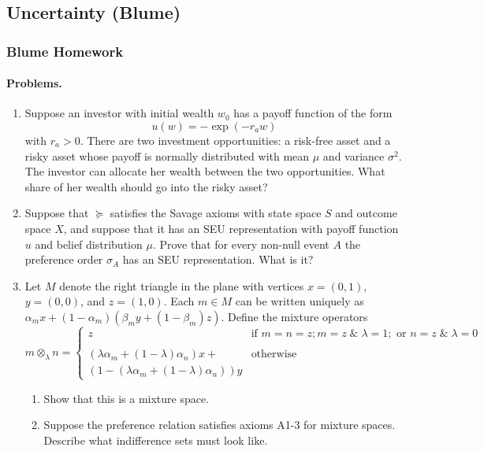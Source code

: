 \documentclass[12pt]{article}
\begin{document}
\newpage
\subsection{Uncertainty (Blume)}

\subsubsection{Blume Homework}

\paragraph{Problems.}

\begin{enumerate}
	\item Suppose an investor with initial wealth $w_0$ has a payoff function of the form
	\[
	u(w) = -\exp (-r_a w)
	\]
	with $r_a > 0$. There are two investment opportunities: a risk-free asset and a risky asset whose payoff is normally distributed with mean $\mu$ and variance $\sigma^2$. The investor can allocate her wealth between the two opportunities. What share of her wealth should go into the risky asset?
	\item Suppose that $\succeq$ satisfies the Savage axioms with state space $S$ and outcome space $X$, and suppose that it has an SEU representation with payoff function $u$ and belief distribution $\mu$. Prove that for every non-null event $A$ the preference order $\sigma_A$ has an SEU representation. What is it?
	\item Let $M$ denote the right triangle in the plane with vertices $x = (0,1)$, $y = (0,0)$, and $z = (1,0)$. Each $m \in M$ can be written uniquely as $\alpha_mx + (1-\alpha_m)(\beta_m y + (1-\beta_m)z)$. Define the mixture operators
	\[
	m \otimes_\lambda n = \begin{cases} z & \text{if } m = n = z; m = z \;\&\; \lambda=1 ; \text{ or } n = z \;\&\; \lambda = 0 \\  \\ (\lambda \alpha_m + (1-\lambda)\alpha_n)x + & \text{otherwise} \\ (1 - (\lambda \alpha_m + (1-\lambda)\alpha_n))y\end{cases}
	\]
	\begin{enumerate}
		\item Show that this is a mixture space.
		\item Suppose the preference relation satisfies axioms A1-3 for mixture spaces. Describe what indifference sets must look like.

\end{enumerate}
\end{enumerate}
\end{document}
